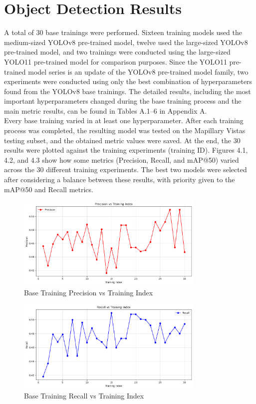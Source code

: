 \section{Object Detection Results}\label{sec:objectdetectionresults}

A total of 30 base trainings were performed. Sixteen training models used the medium-sized YOLOv8 pre-trained model, twelve used the large-sized YOLOv8 pre-trained model, and two trainings were conducted using the large-sized YOLO11 pre-trained model for comparison purposes. Since the YOLO11 pre-trained model series is an update of the YOLOv8 pre-trained model family, two experiments were conducted using only the best combination of hyperparameters found from the YOLOv8 base trainings. The detailed results, including the most important hyperparameters changed during the base training process and the main metric results, can be found in Tables A.1–6 in Appendix A.\\

Every base training varied in at least one hyperparameter. After each training process was completed, the resulting model was tested on the Mapillary Vistas testing subset, and the obtained metric values were saved. At the end, the 30 results were plotted against the training experiments (training ID). Figures 4.1, 4.2, and 4.3 show how some metrics (Precision, Recall, and mAP@50) varied across the 30 different training experiments. The best two models were selected after considering a balance between these results, with priority given to the mAP@50 and Recall metrics.

\newpage
\begin{figure}[h!]
    \centering
    \includegraphics[width=0.8\textwidth]{src/images/bt_precision.png}
    \caption{Base Training Precision vs Training Index}
    \label{fig:bt1}
\end{figure}

\begin{figure}[h!]
    \centering
    \includegraphics[width=0.8\textwidth]{src/images/bt_recall.png}
    \caption{Base Training Recall vs Training Index}
    \label{fig:bt2}
\end{figure}

